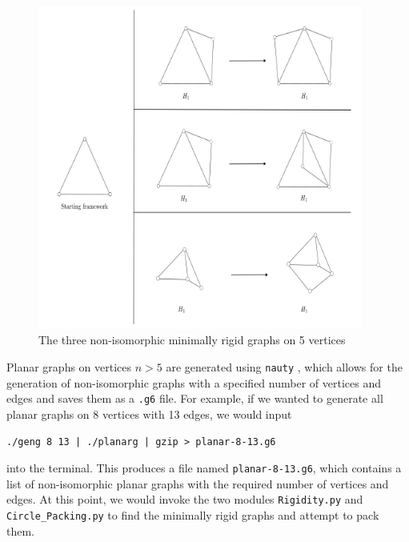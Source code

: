 \begin{figure}[htbp]
    \centering
    \includegraphics[width = 0.95\textwidth]{Chapter 4/4. n=5.png}
    \caption{The three non-isomorphic minimally rigid graphs on 5 vertices}
    \label{fig4: n = 5 Laman}
\end{figure}

\begin{flushleft}
Planar graphs on vertices $n > 5$ are generated using \texttt{nauty} \cite{nauty}, which allows for the generation of non-isomorphic graphs with a specified number of vertices and edges and saves them as a \texttt{.g6} file. For example, if we wanted to generate all planar graphs on 8 vertices with 13 edges, we would input
\end{flushleft}

\begin{center}
\texttt{./geng 8 13 | ./planarg | gzip > planar-8-13.g6}    
\end{center}

\begin{flushleft}
into the terminal. This produces a file named \texttt{planar-8-13.g6}, which contains a list of non-isomorphic planar graphs with the required number of vertices and edges. At this point, we would invoke the two modules \texttt{Rigidity.py} and \texttt{Circle\_Packing.py} to find the minimally rigid graphs and attempt to pack them.     
\end{flushleft}


